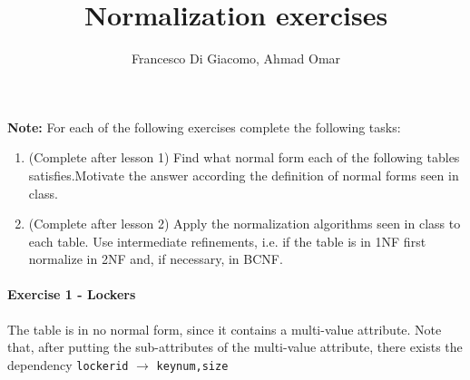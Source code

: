 \documentclass[10pt,a4paper]{article}
\author{Francesco Di Giacomo, Ahmad Omar}
\date { }
\title{Normalization exercises}
\newcommand{\fdep}[2]{#1 $\rightarrow$ #2}
\begin{document}
	\maketitle
	
	\textbf{Note:} For each of the following exercises complete the following tasks:
	\begin{enumerate}
		\item (Complete after lesson 1) Find what normal form each of the following tables satisfies.Motivate the answer according the definition of normal forms seen in class.
		\item (Complete after lesson 2) Apply the normalization algorithms seen in class to each table. Use intermediate refinements, i.e. if the table is in 1NF first normalize in 2NF and, if necessary, in BCNF.
	\end{enumerate}
	
	
	\paragraph*{Exercise 1 - Lockers}
	
	The table is in no normal form, since it contains a multi-value attribute. Note that, after putting the sub-attributes of the multi-value attribute, there exists the dependency \fdep{\texttt{locker\textunderscore id}}{\texttt{key\textunderscore num,size}}
	
\end{document}
